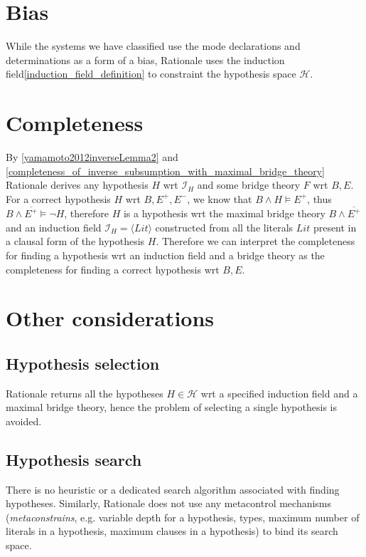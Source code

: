 \section{Bias}
While the systems we have classified use the mode declarations and determinations as a form of a bias, Rationale uses the induction field\ref{induction_field_definition} to constraint the hypothesis space $\mathcal{H}$.

\section{Completeness}
By \ref{yamamoto2012inverseLemma2} and \ref{completeness_of_inverse_subsumption_with_maximal_bridge_theory} Rationale derives any hypothesis $H$ wrt $\mathcal{I}_H$ and some bridge theory $F$ wrt $B, E$. For a correct hypothesis $H$ wrt $B, E^+, E^-$, we know that $B \land H \models E^+$, thus $B \land \overline{E^+} \models \neg H$, therefore $H$ is a hypothesis wrt the maximal bridge theory $B \land \overline{E^+}$ and an induction field $\mathcal{I}_H=\langle Lit \rangle$ constructed from all the literals $Lit$ present in a clausal form of the hypothesis $H$. Therefore we can interpret the completeness for finding a hypothesis wrt an induction field and a bridge theory as the completeness for finding a correct hypothesis wrt $B, E$.

\section{Other considerations}
\subsection{Hypothesis selection}
Rationale returns all the hypotheses $H \in \mathcal{H}$ wrt a specified induction field and a maximal bridge theory, hence the problem of selecting a single hypothesis is avoided.

\subsection{Hypothesis search}\label{subsec:rationale_hypothesis_search}
There is no heuristic or a dedicated search algorithm associated with finding hypotheses. Similarly, Rationale does not use any metacontrol mechanisms (\emph{metaconstrains}, e.g. variable depth for a hypothesis, types, maximum number of literals in a hypothesis, maximum clauses in a hypothesis) to bind its search space.


